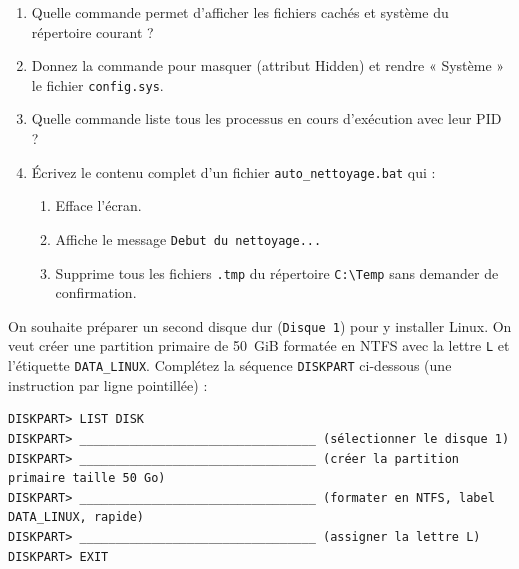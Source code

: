 \documentclass[11pt]{article}
\begin{document}
\begin{exercice}
\begin{enumerate}
    \item Quelle commande permet d'afficher les fichiers cachés et système du répertoire courant ?
    \item Donnez la commande pour masquer (attribut Hidden) et rendre « Système » le fichier \texttt{config.sys}.
    \item Quelle commande liste tous les processus en cours d'exécution avec leur PID ?
    \item Écrivez le contenu complet d'un fichier \texttt{auto\_nettoyage.bat} qui :
    \begin{enumerate}
        \item Efface l'écran.
        \item Affiche le message \texttt{Debut du nettoyage...}
        \item Supprime tous les fichiers \texttt{.tmp} du répertoire \texttt{C:\textbackslash Temp} sans demander de confirmation.
    \end{enumerate}
\end{enumerate}
\end{exercice}

\begin{exercice}
On souhaite préparer un second disque dur (\texttt{Disque 1}) pour y installer Linux. On veut créer une partition primaire de \SI{50}{GiB} formatée en NTFS avec la lettre \texttt{L} et l'étiquette \texttt{DATA\_LINUX}.
Complétez la séquence \texttt{DISKPART} ci-dessous (une instruction par ligne pointillée) :
\begin{verbatim}
DISKPART> LIST DISK
DISKPART> _________________________________ (sélectionner le disque 1)
DISKPART> _________________________________ (créer la partition primaire taille 50 Go)
DISKPART> _________________________________ (formater en NTFS, label DATA_LINUX, rapide)
DISKPART> _________________________________ (assigner la lettre L)
DISKPART> EXIT
\end{verbatim}
\end{exercice}
\end{document}
